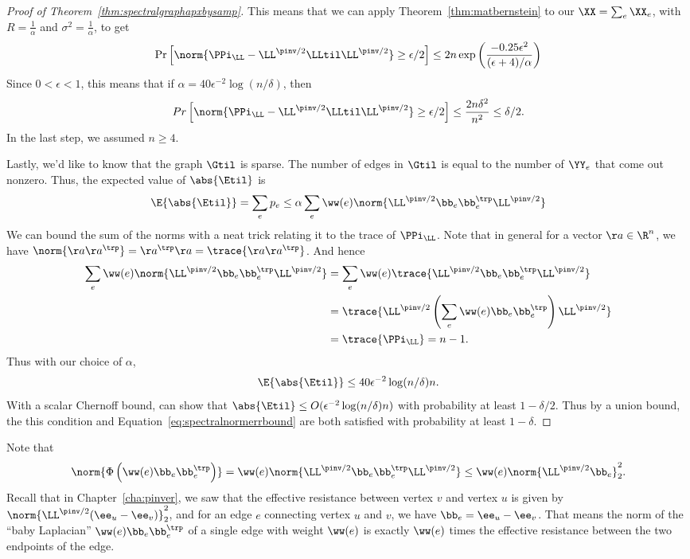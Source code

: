 \begin{proof}[Proof of Theorem~\ref{thm:spectralgraphapxbysamp}]
This means that we can apply Theorem~\ref{thm:matbernstein} to our
$\XX = \sum_e \XX_e$, with $R =  \frac{1}{\alpha}$ and $\sigma^2 =
\frac{1}{\alpha}$, to get
\[
  \Pr\left[\norm{\PPi_{\LL} - \LL^{\pinv/2}\LLtil\LL^{\pinv/2}}
  \geq  \epsilon/2\right]
  \leq 2n\exp\left(\frac{-0.25 \epsilon^2}{(\epsilon +
      4)/\alpha}\right)
\]
Since $0 < \epsilon < 1$, this means that if
$\alpha = 40 \epsilon^{-2}  \log(n/\delta)$,
then
\[
  Pr\left[\norm{\PPi_{\LL} - \LL^{\pinv/2}\LLtil\LL^{\pinv/2}}
    \geq  \epsilon/2\right]
\leq \frac{2n\delta^2}{n^2} \leq \delta/2.
\]
In the last step, we assumed $n \geq 4$.

Lastly, we'd like to know that the graph $\Gtil$ is sparse.
The number of edges in $\Gtil$ is equal to the number of $\YY_e$ that
come out nonzero.
Thus, the expected value of $\abs{\Etil}$ is
\[
  \E{\abs{\Etil}}
  =
  \sum_e p_e \leq \alpha \sum_e \ww(e) \norm{\LL^{\pinv/2}\bb_e\bb_e^{\trp}\LL^{\pinv/2}}
\]
We can bound the sum of the norms with a neat trick relating it to the
trace of $\PPi_{\LL}$.
Note that in general for a vector $\aa \in \R^n$, we have
$\norm{\aa\aa^{\trp}} = \aa^{\trp}\aa = \trace{\aa\aa^{\trp}}$.
And hence
\begin{align*}
  \sum_e
  \ww(e)
  \norm{\LL^{\pinv/2}\bb_e\bb_e^{\trp}\LL^{\pinv/2}}
  &=
  \sum_e
  \ww(e)
  \trace{\LL^{\pinv/2}\bb_e\bb_e^{\trp}\LL^{\pinv/2}}
  \\
  &=
  \trace{ \LL^{\pinv/2}  \left( \sum_e\ww(e) \bb_e\bb_e^{\trp}
    \right)\LL^{\pinv/2}}
  \\
  &= \trace{ \PPi_{\LL} } = n-1.
\end{align*}
Thus with our choice of $\alpha$,
\[
  \E{\abs{\Etil}} \leq 40 \epsilon^{-2}  \log(n/\delta) n.
\]
With a scalar Chernoff bound, can show that $\abs{\Etil} \leq O( \epsilon^{-2}  \log(n/\delta) n)$
with probability at least $1-\delta/2$.
Thus by a union bound, the this condition and
Equation~\eqref{eq:spectralnormerrbound} are both satisfied with
probability at least $1-\delta$.
\end{proof}

\begin{remark}
  Note that
  \[
    \norm{\Phi\left(\ww(e) \bb_e\bb_e^{\trp} \right)}
    =
    \ww(e)
   \norm{\LL^{\pinv/2}\bb_e\bb_e^{\trp}\LL^{\pinv/2}}
  \leq
  \ww(e)\norm{ \LL^{\pinv/2}\bb_e}_2^2.
  \]
  Recall that in Chapter~\ref{cha:pinver}, we saw that the effective resistance between vertex
  $v$ and vertex $u$ is given by
  $\norm{ \LL^{\pinv/2}(\ee_u - \ee_v)}_2^2$, and for an edge $e$
  connecting vertex $u$ and $v$, we have $\bb_{e}= \ee_u - \ee_v$.
 That means the norm of the ``baby Laplacian'' $\ww(e) \bb_e\bb_e^{\trp}$ of a single edge with weight
  $\ww(e)$ is exactly $\ww(e)$ times the effective resistance between
  the two endpoints of the edge.
\end{remark}

